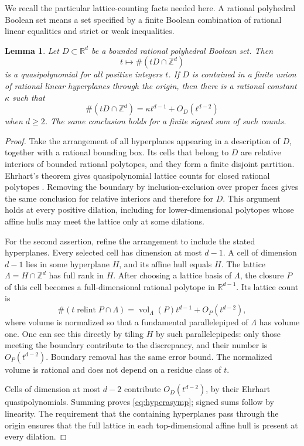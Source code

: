 \documentclass[11pt]{article}
\newtheorem{lemma}[theorem]{Lemma}
\theoremstyle{remark}\newtheorem{remark}[theorem]{Remark}
\newcommand{\Z}{\mathbb Z}
\newcommand{\R}{\mathbb R}
\newcommand{\relint}{\operatorname{relint}}
\begin{document}
We recall the particular lattice-counting facts needed here. A rational polyhedral Boolean set means a set specified by a finite Boolean combination of rational linear equalities and strict or weak inequalities.

\begin{lemma}\label{lem:ehrhart}
Let $D\subset\R^d$ be a bounded rational polyhedral Boolean set. Then
\[
 t\longmapsto\#(tD\cap\Z^d)
\]
is a quasipolynomial for all positive integers $t$. If $D$ is contained in a finite union of rational linear hyperplanes through the origin, then there is a rational constant $\kappa$ such that
\begin{equation}\label{eq:hyperasymp}
 \#(tD\cap\Z^d)=\kappa t^{d-1}+O_D(t^{d-2})
\end{equation}
when $d\ge2$. The same conclusion holds for a finite signed sum of such counts.
\end{lemma}

\begin{proof}
Take the arrangement of all hyperplanes appearing in a description of $D$, together with a rational bounding box. Its cells that belong to $D$ are relative interiors of bounded rational polytopes, and they form a finite disjoint partition. Ehrhart's theorem gives quasipolynomial lattice counts for closed rational polytopes \cite[Theorem 3.23]{BR}. Removing the boundary by inclusion-exclusion over proper faces gives the same conclusion for relative interiors and therefore for $D$. This argument holds at every positive dilation, including for lower-dimensional polytopes whose affine hulls may meet the lattice only at some dilations.

For the second assertion, refine the arrangement to include the stated hyperplanes. Every selected cell has dimension at most $d-1$. A cell of dimension $d-1$ lies in some hyperplane $H$, and its affine hull equals $H$. The lattice $\Lambda=H\cap\Z^d$ has full rank in $H$. After choosing a lattice basis of $\Lambda$, the closure $P$ of this cell becomes a full-dimensional rational polytope in $\R^{d-1}$. Its lattice count is
\[
 \#(t\relint P\cap\Lambda)
   =\operatorname{vol}_{\Lambda}(P)t^{d-1}+O_P(t^{d-2}),
\]
where volume is normalized so that a fundamental parallelepiped of $\Lambda$ has volume one. One can see this directly by tiling $H$ by such parallelepipeds: only those meeting the boundary contribute to the discrepancy, and their number is $O_P(t^{d-2})$. Boundary removal has the same error bound. The normalized volume is rational and does not depend on a residue class of $t$.

Cells of dimension at most $d-2$ contribute $O_D(t^{d-2})$, by their Ehrhart quasipolynomials. Summing proves \eqref{eq:hyperasymp}; signed sums follow by linearity. The requirement that the containing hyperplanes pass through the origin ensures that the full lattice in each top-dimensional affine hull is present at every dilation.
\end{proof}
\end{document}
